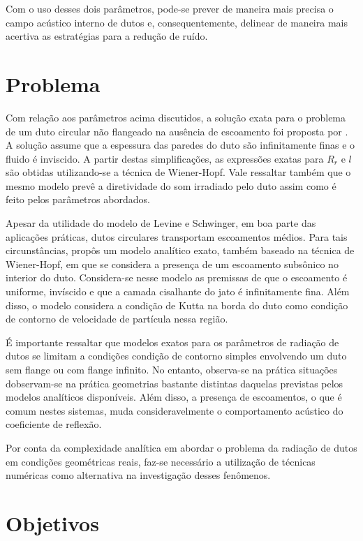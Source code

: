 Com o uso desses dois parâmetros, pode-se prever de maneira mais precisa o campo acústico interno de dutos e, consequentemente, delinear de maneira mais acertiva as estratégias para a redução de ruído.

\section{Problema}

Com relação aos parâmetros acima discutidos, a solução exata para o problema de um duto circular não flangeado na ausência de escoamento foi proposta por . A solução assume que a espessura das paredes do duto são infinitamente finas e o fluido é inviscido. A partir destas simplificações, as expressões exatas para $R_{r}$ e $l$ são obtidas utilizando-se a técnica de Wiener-Hopf. Vale ressaltar também que o mesmo modelo prevê a diretividade do som irradiado pelo duto assim como é feito pelos parâmetros abordados.

Apesar da utilidade do modelo de Levine e Schwinger, em boa parte das aplicações práticas, dutos circulares transportam escoamentos médios. Para tais circunstâncias,  propôs um modelo analítico exato, também baseado na técnica de Wiener-Hopf, em que se considera a presença de um escoamento subsônico no interior do duto. Considera-se nesse modelo as premissas de que o escoamento é uniforme, invíscido e que a camada cisalhante do jato é infinitamente fina. Além disso, o modelo considera a condição de Kutta na borda do duto como condição de contorno de velocidade de partícula nessa região.

É importante ressaltar que modelos exatos para os parâmetros de radiação de dutos se limitam a condições condição de contorno simples envolvendo um duto sem flange ou com flange infinito. No entanto, observa-se na prática situações dobservam-se na prática geometrias bastante distintas daquelas previstas pelos modelos analíticos disponíveis. Além disso, a presença de escoamentos, o que é comum nestes sistemas, muda consideravelmente o comportamento acústico do coeficiente de reflexão.

Por conta da complexidade analítica em abordar o problema da radiação de dutos em condições geométricas reais, faz-se necessário a utilização de técnicas numéricas como alternativa na investigação desses fenômenos.


\section{Objetivos}

